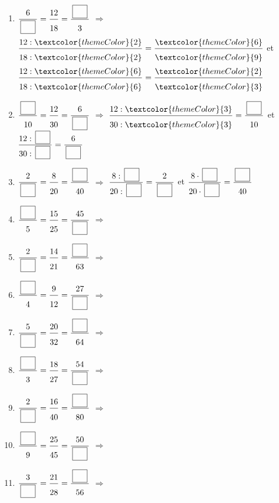 \begin{enumerate}[leftmargin=*,align=parleft, label=\alph*), itemsep=9pt]
\item $\FA{6}{\CaseC}=\FA{12}{18}=\FA{\CaseC}{3}$ \quad $\Longrightarrow$ \quad $\FA{12 : \textcolor{themeColor}{2}}{18 : \textcolor{themeColor}{2}}=\FA{\textcolor{themeColor}{6}}{\textcolor{themeColor}{9}}$ \quad et \quad $\FA{12 : \textcolor{themeColor}{6}}{18 : \textcolor{themeColor}{6}}=\FA{\textcolor{themeColor}{2}}{\textcolor{themeColor}{3}}$
\item $\FA{\CaseC}{10}=\FA{12}{30}=\FA{6}{\CaseC}$ \quad $\Longrightarrow$ \quad $\FA{12 : \textcolor{themeColor}{3}}{30 : \textcolor{themeColor}{3}}=\FA{\CaseC}{10}$ \quad et \quad $\FA{12 : \CaseC}{30 : \CaseC}=\FA{6}{\CaseC}$
\item $\FA{2}{\CaseC}=\FA{8}{20}=\FA{\CaseC}{40}$ \quad $\Longrightarrow$ \quad $\FA{8 : \CaseC}{20 : \CaseC}=\FA{2}{\CaseC}$ \quad et \quad $\FA{8 \cdot \CaseC}{20 \cdot \CaseC}=\FA{\CaseC}{40}$
\item $\FA{\CaseC}{5}=\FA{15}{25}=\FA{45}{\CaseC}$ \quad $\Longrightarrow$
\item $\FA{2}{\CaseC}=\FA{14}{21}=\FA{\CaseC}{63}$ \quad $\Longrightarrow$
\item $\FA{\CaseC}{4}=\FA{9}{12}=\FA{27}{\CaseC}$ \quad $\Longrightarrow$
\item $\FA{5}{\CaseC}=\FA{20}{32}=\FA{\CaseC}{64}$ \quad $\Longrightarrow$
\item $\FA{\CaseC}{3}=\FA{18}{27}=\FA{54}{\CaseC}$ \quad $\Longrightarrow$
\item $\FA{2}{\CaseC}=\FA{16}{40}=\FA{\CaseC}{80}$ \quad $\Longrightarrow$
\item $\FA{\CaseC}{9}=\FA{25}{45}=\FA{50}{\CaseC}$ \quad $\Longrightarrow$
\item $\FA{3}{\CaseC}=\FA{21}{28}=\FA{\CaseC}{56}$ \quad $\Longrightarrow$
\end{enumerate}
 
\newpage
{}
 
